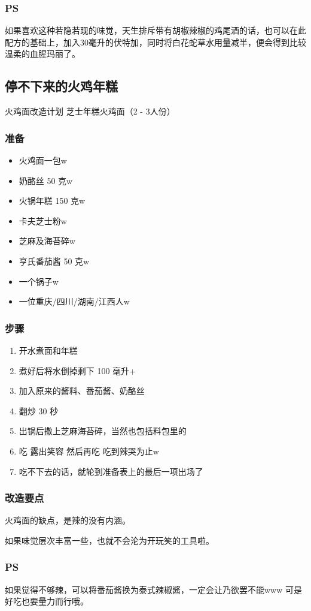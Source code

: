 \documentclass[12pt, a4paper]{ctexart}
\begin{document}
\subsubsection{PS}
如果喜欢这种若隐若现的味觉，天生排斥带有胡椒辣椒的鸡尾酒的话，也可以在此配方的基础上，加入30毫升的伏特加，同时将白花蛇草水用量减半，便会得到比较温柔的血腥玛丽了。

\subsection{停不下来的火鸡年糕}
火鸡面改造计划 芝士年糕火鸡面（2 - 3人份）

\subsubsection{准备}
\begin{itemize}
    \item{火鸡面一包w}
    \item{奶酪丝 50 克w}
    \item{火锅年糕 150 克w}
    \item{卡夫芝士粉w}
    \item{芝麻及海苔碎w}
    \item{亨氏番茄酱 50 克w}
    \item{一个锅子w}
    \item{一位重庆/四川/湖南/江西人w}
\end{itemize}

\subsubsection{步骤}
\begin{enumerate}[start=0]
    \item{开水煮面和年糕}
    \item{煮好后将水倒掉剩下 100 毫升+}
    \item{加入原来的酱料、番茄酱、奶酪丝}
    \item{翻炒 30 秒}
    \item{出锅后撒上芝麻海苔碎，当然也包括料包里的}
    \item{吃 露出笑容 然后再吃 吃到辣哭为止w}
    \item{吃不下去的话，就轮到准备表上的最后一项出场了}
\end{enumerate}

\subsubsection{改造要点}
火鸡面的缺点，是辣的没有内涵。

如果味觉层次丰富一些，也就不会沦为开玩笑的工具啦。

\subsubsection{PS}
如果觉得不够辣，可以将番茄酱换为泰式辣椒酱，一定会让乃欲罢不能www 可是好吃也要量力而行哦。
\end{document}
